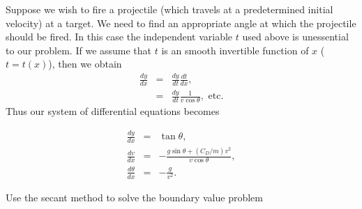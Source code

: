 Suppose we wish to fire a projectile (which travels at a predetermined initial velocity) at a target. We need to find an appropriate angle at which the projectile should be fired. In this case the independent variable $t$ used above is unessential to our problem. If we assume that $t$ is an smooth invertible function of $x$ ($t = t(x)$), then we obtain 
\begin{eqnarray*}
\frac{dy}{dx} &=& \frac{dy}{dt}\frac{dt}{dx} ,\\
&=& \frac{dy}{dt} \frac{1}{v\cos{\theta}}, \text{  etc.}
\end{eqnarray*}
Thus our system of differential equations becomes 

\begin{eqnarray*}
\frac{dy}{dx} &=& \tan {\theta} ,\\
\frac{dv}{dx} &=& -\frac{g \sin{\theta} + (C_D/m)v^2}{v \cos{\theta}} ,\\
\frac{d\theta}{dx} &=& -\frac{g}{v^2}.
\end{eqnarray*}



\begin{problem}
Use the secant method to solve the boundary value problem 

\end{problem}






